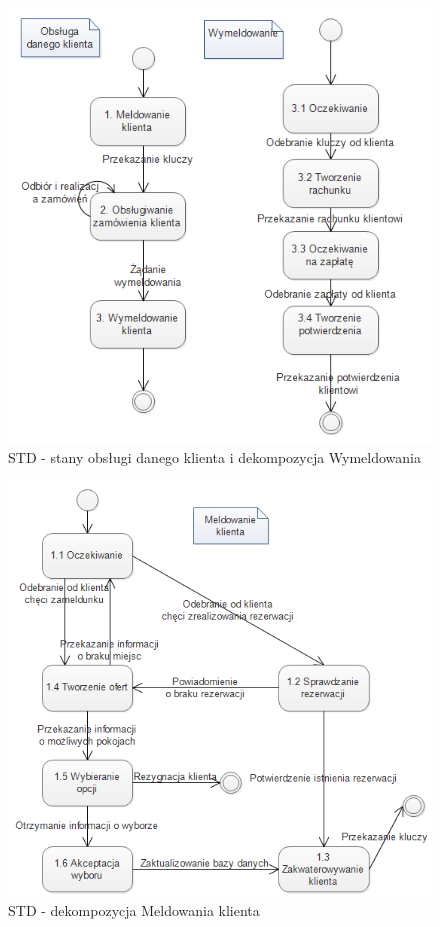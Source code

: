 \documentclass[a4paper, 11pt]{article}
\begin{document}
	\indent
	\begin{figure}[H]%
			\includegraphics[scale=1.0]{Img/STD-klient1.png}
			\caption{STD - stany obsługi danego klienta i dekompozycja Wymeldowania}
	\end{figure}
	\indent
	\begin{figure}[H]%
		\includegraphics[scale=1.0]{Img/STD-klient2.png}
		\caption{STD - dekompozycja Meldowania klienta}
	\end{figure}
\end{document}
